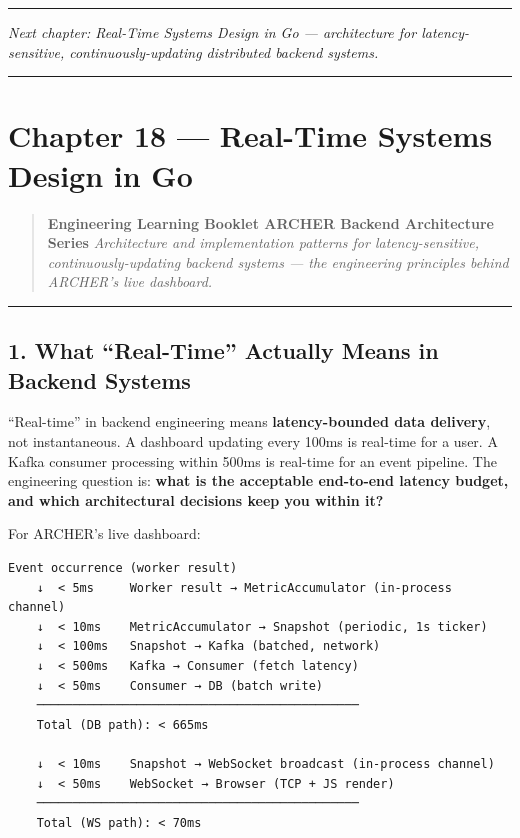 \documentclass[
]{article}
\begin{document}
\begin{center}\rule{0.5\linewidth}{0.5pt}\end{center}

\emph{Next chapter: Real-Time Systems Design in Go --- architecture for
latency-sensitive, continuously-updating distributed backend systems.}

\begin{center}\rule{0.5\linewidth}{0.5pt}\end{center}

\hypertarget{chapter-18-real-time-systems-design-in-go}{%
\section{Chapter 18 --- Real-Time Systems Design in
Go}\label{chapter-18-real-time-systems-design-in-go}}

\begin{quote}
\textbf{Engineering Learning Booklet \textbar{} ARCHER Backend
Architecture Series} \emph{Architecture and implementation patterns for
latency-sensitive, continuously-updating backend systems --- the
engineering principles behind ARCHER's live dashboard.}
\end{quote}

\begin{center}\rule{0.5\linewidth}{0.5pt}\end{center}

\hypertarget{what-real-time-actually-means-in-backend-systems}{%
\subsection{1. What ``Real-Time'' Actually Means in Backend
Systems}\label{what-real-time-actually-means-in-backend-systems}}

``Real-time'' in backend engineering means \textbf{latency-bounded data
delivery}, not instantaneous. A dashboard updating every 100ms is
real-time for a user. A Kafka consumer processing within 500ms is
real-time for an event pipeline. The engineering question is:
\textbf{what is the acceptable end-to-end latency budget, and which
architectural decisions keep you within it?}

For ARCHER's live dashboard:

\begin{verbatim}
Event occurrence (worker result)
    ↓  < 5ms     Worker result → MetricAccumulator (in-process channel)
    ↓  < 10ms    MetricAccumulator → Snapshot (periodic, 1s ticker)
    ↓  < 100ms   Snapshot → Kafka (batched, network)
    ↓  < 500ms   Kafka → Consumer (fetch latency)
    ↓  < 50ms    Consumer → DB (batch write)
    ─────────────────────────────────────────────
    Total (DB path): < 665ms

    ↓  < 10ms    Snapshot → WebSocket broadcast (in-process channel)
    ↓  < 50ms    WebSocket → Browser (TCP + JS render)
    ─────────────────────────────────────────────
    Total (WS path): < 70ms
\end{verbatim}
\end{document}
